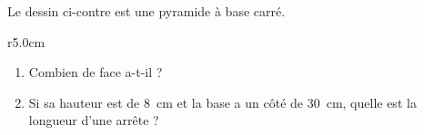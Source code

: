 
\begin{exercice}\label{exo2smath-0180}


Le dessin ci-contre est une pyramide à base carré.
\begin{wrapfigure}{r}{5.0cm}
   \vspace{-0.5cm}        %
   \centering
   
\end{wrapfigure}
\begin{enumerate}
    \item
Combien de face a-t-il ?
    \item
        Si sa hauteur est de \SI{8}{\centi\meter} et la base a un côté de \SI{30}{\centi\meter}, quelle est la longueur d'une arrête ?
\end{enumerate}

\end{exercice}
